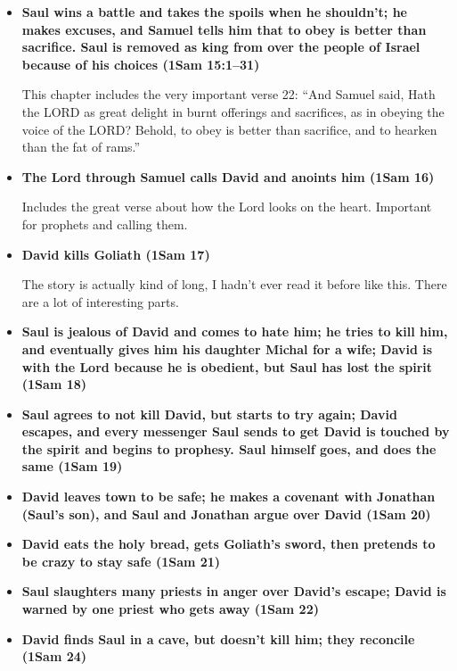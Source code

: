 \begin{itemize}
	Note that Saul calls for the ark right before this story, in verse 18.
	
\item \textbf{Saul wins a battle and takes the spoils when he shouldn't; he makes excuses, and Samuel tells him that to obey is better than sacrifice. Saul is removed as king from over the people of Israel because of his choices (1Sam 15:1--31)}

	This chapter includes the very important verse 22: ``And Samuel said, Hath the LORD as great delight in burnt offerings and sacrifices, as in obeying the voice of the LORD? Behold, to obey is better than sacrifice, and to hearken than the fat of rams.''

\item \textbf{The Lord through Samuel calls David and anoints him (1Sam 16)}

	Includes the great verse about how the Lord looks on the heart. Important for prophets and calling them.
	
\item \textbf{David kills Goliath (1Sam 17)}

	The story is actually kind of long, I hadn't ever read it before like this. There are a lot of interesting parts.
	
\item \textbf{Saul is jealous of David and comes to hate him; he tries to kill him, and eventually gives him his daughter Michal for a wife; David is with the Lord because he is obedient, but Saul has lost the spirit (1Sam 18)}

\item \textbf{Saul agrees to not kill David, but starts to try again; David escapes, and every messenger Saul sends to get David is touched by the spirit and begins to prophesy. Saul himself goes, and does the same (1Sam 19)}

\item \textbf{David leaves town to be safe; he makes a covenant with Jonathan (Saul's son), and Saul and Jonathan argue over David (1Sam 20)}

\item \textbf{David eats the holy bread, gets Goliath's sword, then pretends to be crazy to stay safe (1Sam 21)}

\item \textbf{Saul slaughters many priests in anger over David's escape; David is warned by one priest who gets away (1Sam 22)}

\item \textbf{David finds Saul in a cave, but doesn't kill him; they reconcile (1Sam 24)}


\end{itemize}
